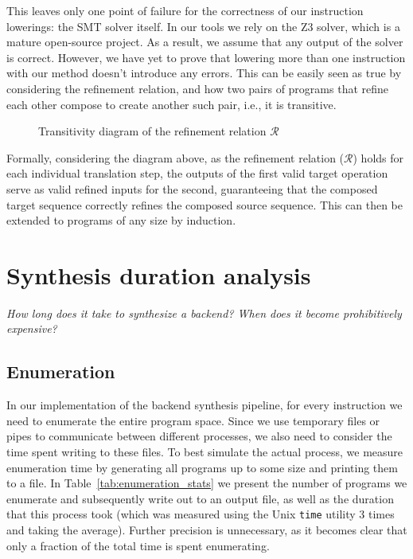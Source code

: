 This leaves only one point of failure for the correctness of our instruction lowerings: 
the SMT solver itself. In our tools we rely on the Z3 solver, which is a mature 
open-source project. As a result, we assume that any output of the solver is correct. However,
we have yet to prove that lowering more than one instruction with our method doesn't introduce
any errors. This can be easily seen as true by considering the refinement relation, and how
two pairs of programs that refine each other compose to create another such pair, i.e., it is 
transitive.

\begin{figure}[H]
    \centering
    \caption{Transitivity diagram of the refinement relation $\mathcal{R}$}
    \label{fig:refinement_composition}
\end{figure}

Formally, considering the diagram above, as the refinement relation ($\mathcal{R}$) 
holds for each individual translation step, the outputs of the first valid target operation 
serve as valid refined inputs for the second, guaranteeing that the composed 
target sequence correctly refines the composed source sequence. This can then be extended
to programs of any size by induction.

\section{Synthesis duration analysis}
\emph{How long does it take to synthesize a backend? When does it become prohibitively expensive?}
\label{eval-synthesis-duration}

\subsection{Enumeration}

In our implementation of the backend synthesis pipeline, for every instruction we need 
to enumerate the entire program space. Since we use temporary files or pipes to communicate 
between different processes, we also need to consider the time spent writing to these files. 
To best simulate the actual process, we measure enumeration time by generating all programs up
to some size and printing them to a file.
%
In Table~\ref{tab:enumeration_stats} we present the number of programs we enumerate and subsequently
write out to an output file, as well as the duration that this process took (which was measured
using the Unix \texttt{time} utility 3 times and taking the average). Further precision is unnecessary,
as it becomes clear that only a fraction of the total time is spent enumerating.

